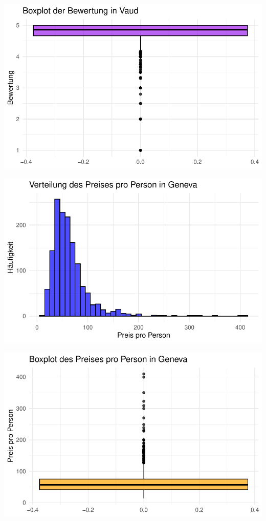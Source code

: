 \documentclass[
  journal,
]{IEEEtran}%
\begin{document}
\includegraphics{main_files/figure-pdf/descriptive vaud-4.pdf}

\includegraphics{main_files/figure-pdf/descriptive geneva-1.pdf}

\includegraphics{main_files/figure-pdf/descriptive geneva-2.pdf}
\end{document}
